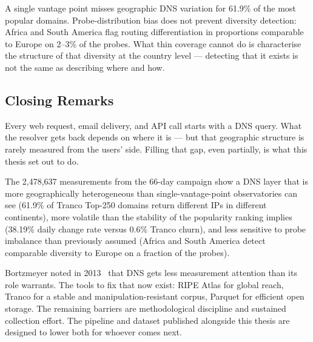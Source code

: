 A single vantage point misses geographic \ac{DNS} variation for 61.9\% of the most popular domains. Probe-distribution bias does not prevent diversity detection: Africa and South America flag routing differentiation in proportions comparable to Europe on 2--3\% of the probes. What thin coverage cannot do is characterise the structure of that diversity at the country level --- detecting that it exists is not the same as describing where and how.

\bigskip
\subsection{Closing Remarks}
\label{subsec:5.5.4}

Every web request, email delivery, and API call starts with a \ac{DNS} query. What the resolver gets back depends on where it is --- but that geographic structure is rarely measured from the users' side. Filling that gap, even partially, is what this thesis set out to do.

The 2,478,637 measurements from the 66-day campaign show a \ac{DNS} layer that is more geographically heterogeneous than single-vantage-point observatories can see (61.9\% of Tranco Top-250 domains return different \ac{IP}s in different continents), more volatile than the stability of the popularity ranking implies (38.19\% daily change rate versus 0.6\% Tranco churn), and less sensitive to probe imbalance than previously assumed (Africa and South America detect comparable diversity to Europe on a fraction of the probes).

Bortzmeyer noted in 2013~\cite{Bortzmeyer2013} that \ac{DNS} gets less measurement attention than its role warrants. The tools to fix that now exist: RIPE Atlas for global reach, Tranco for a stable and manipulation-resistant corpus, Parquet for efficient open storage. The remaining barriers are methodological discipline and sustained collection effort. The pipeline and dataset published alongside this thesis are designed to lower both for whoever comes next.
